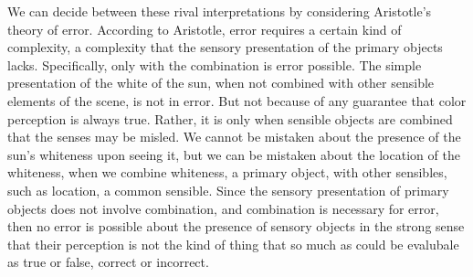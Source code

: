 We can decide between these rival interpretations by considering Aristotle's theory of error. According to Aristotle, error requires a certain kind of complexity, a complexity that the sensory presentation of the primary objects lacks. Specifically, only with the combination is error possible. The simple presentation of the white of the sun, when not combined with other sensible elements of the scene, is not in error. But not because of any guarantee that color perception is always true. Rather, it is only when sensible objects are combined that the senses may be misled. We cannot be mistaken about the presence of the sun's whiteness upon seeing it, but we can be mistaken about the location of the whiteness, when we combine whiteness, a primary object, with other sensibles, such as location, a common sensible. Since the sensory presentation of primary objects does not involve combination, and combination is necessary for error, then no error is possible about the presence of sensory objects in the strong sense that their perception is not the kind of thing that so much as could be evalubale as true or false, correct or incorrect.



